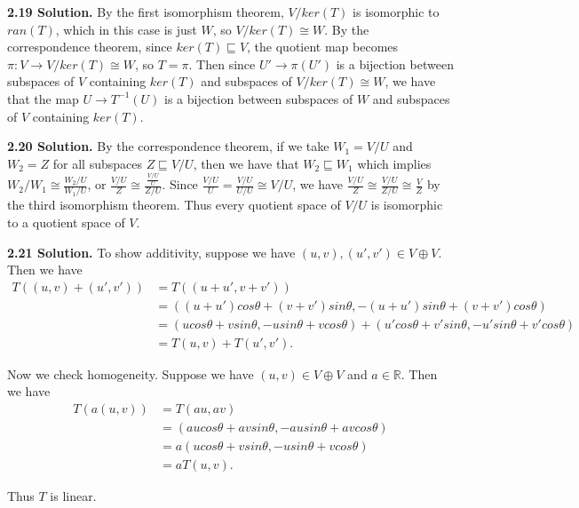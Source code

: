 \textbf{2.19 Solution.} By the first isomorphism theorem, $V/ker(T)$ is isomorphic to $ran(T)$, which in this case is just $W$, so $V/ker(T)\cong W$. By the correspondence theorem, since $ker(T)\sqsubseteq V$, the quotient map becomes $\pi:V\to V/ker(T)\cong W$, so $T=\pi$. Then since $U'\to\pi(U')$ is a bijection between subspaces of $V$ containing $ker(T)$ and subspaces of $V/ker(T)\cong W$, we have that the map $U\to T^{-1}(U)$ is a bijection between subspaces of $W$ and subspaces of $V$ containing $ker(T)$.

\textbf{2.20 Solution.} By the correspondence theorem, if we take $W_1 = V/U$ and $W_2 = Z$ for all subspaces $Z\sqsubseteq V/U$, then we have that $W_2\sqsubseteq W_1$ which implies $W_2/W_1 \cong \frac{W_2/U}{W_1/U}$, or $\frac{V/U}{Z} \cong \frac{\frac{V/U}{U}}{Z/U}$. Since $\frac{V/U}{U} = \frac{V/U}{U/U} \cong V/U$, we have $\frac{V/U}{Z} \cong \frac{V/U}{Z/U} \cong \frac{V}{Z}$ by the third isomorphism theorem. Thus every quotient space of $V/U$ is isomorphic to a quotient space of $V$.

\textbf{2.21 Solution.} To show additivity, suppose we have $(u,v),(u',v')\in V\oplus V$. Then we have
\begin{align*}
    T((u,v)+(u',v')) &= T((u+u',v+v')) \\
                    &= ((u+u')cos\theta + (v+v')sin\theta, -(u+u')sin\theta + (v+v')cos\theta) \\
                    &= (ucos\theta + vsin\theta, -usin\theta + vcos\theta) + (u'cos\theta + v'sin\theta, -u'sin\theta + v'cos\theta) \\
                    &= T(u,v) + T(u',v').
\end{align*}

Now we check homogeneity. Suppose we have $(u,v)\in V\oplus V$ and $a\in\mathbb{R}$. Then we have
\begin{align*}
    T(a(u,v)) &= T(au,av) \\
              &= (aucos\theta + avsin\theta, -ausin\theta + avcos\theta) \\
              &= a(ucos\theta + vsin\theta, -usin\theta + vcos\theta) \\
              &= aT(u,v).
\end{align*}

Thus $T$ is linear.